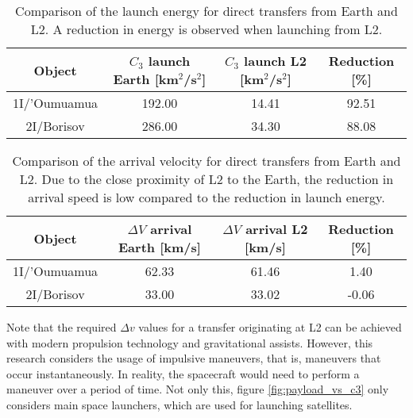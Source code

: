 \vspace{1cm}
\begin{table}[H]
  \centering
  \begin{tabular}{|c|c|c|c|}
    \hline
    Object       & $C_3$ launch Earth [km$^2$/s$^2$] & $C_3$ launch L2 [km$^2$/s$^2$] & Reduction [\%] \\
    \hline
    1I/'Oumuamua & 192.00                            & 14.41                          & 92.51          \\
    \hline
    2I/Borisov   & 286.00                            & 34.30                          & 88.08          \\
    \hline
  \end{tabular}
  \caption[Comparison of the launch energy for direct transfers from Earth and
    L2.]{Comparison of the launch energy for direct transfers from Earth and L2. A reduction in energy is observed when launching from L2.}
  \label{tab:summary-results-c3-launch}
\end{table}

\vspace{1cm}
\begin{table}[H]
  \centering
  \begin{tabular}{|c|c|c|c|}
    \hline
    Object       & $\Delta V$ arrival Earth [km/s] & $\Delta V$ arrival L2 [km/s] & Reduction [\%] \\
    \hline
    1I/'Oumuamua & 62.33                            & 61.46 & 1.40          \\
    \hline
    2I/Borisov   & 33.00                            & 33.02 & -0.06          \\
    \hline
  \end{tabular}
  \caption[Comparison of the arrival velocity for direct transfers from Earth and
    L2.]{Comparison of the arrival velocity for direct transfers from Earth and
        L2. Due to the close proximity of L2 to the Earth, the reduction in
        arrival speed is low compared to the reduction in launch energy.}
  \label{tab:summary-results-arrival-v}
\end{table}




Note that the required $\Delta v$ values for a transfer originating at L2 can be
achieved with modern propulsion technology and gravitational assists. However,
this research considers the usage of impulsive maneuvers, that is, maneuvers
that occur instantaneously. In reality, the spacecraft would need to perform
a maneuver over a period of time. Not only this, figure \ref{fig:payload_vs_c3}
only considers main space launchers, which are used for launching satellites.

